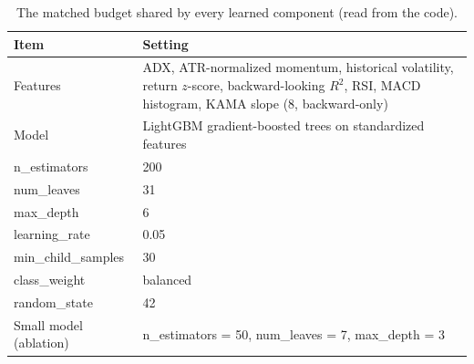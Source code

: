 \begin{table}[!t]
\centering
\caption{The matched budget shared by every learned component (read from the code).}
\label{tab:budget}
\footnotesize
\begin{tabular}{l p{5.2cm}}
\toprule
Item & Setting \\
\midrule
Features & ADX, ATR-normalized momentum, historical volatility, return $z$-score, backward-looking $R^2$, RSI, MACD histogram, KAMA slope (8, backward-only) \\
Model & LightGBM gradient-boosted trees on standardized features \\
n\_estimators & 200 \\
num\_leaves & 31 \\
max\_depth & 6 \\
learning\_rate & 0.05 \\
min\_child\_samples & 30 \\
class\_weight & balanced \\
random\_state & 42 \\
Small model (ablation) & n\_estimators = 50, num\_leaves = 7, max\_depth = 3 \\
\bottomrule
\end{tabular}
\end{table}
